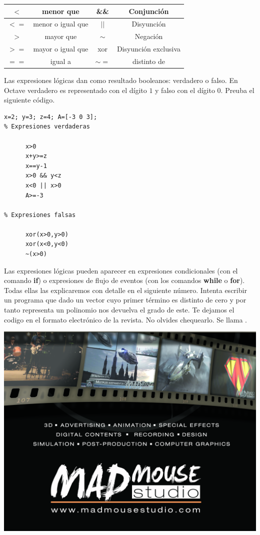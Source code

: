 \begin{center}
\begin{tabular}{|cc||cc|}
\hline
$<$ & menor que & \&\& & Conjunción\\
\hline
$<=$ & menor o igual que & $||$ & Disyunción\\
\hline
$ >$ & mayor que & $\sim$ & Negación\\
\hline
$>=$ & mayor o igual que & xor & Disyunción exclusiva\\
\hline
$==$ & igual a & $\sim =$ & distinto de\\
\hline
\end{tabular}
\end{center}

Las expresiones lógicas dan como resultado booleanos: verdadero o falso. En Octave verdadero es representado con el dígito $1$ y falso con el dígito $0$.  Preuba el siguiente código.

\begin{octavebox}
\begin{verbatim}
x=2; y=3; z=4; A=[-3 0 3];
% Expresiones verdaderas

      x>0
      x+y>=z
      x==y-1
      x>0 && y<z
      x<0 || x>0
      A>=-3
      
% Expresiones falsas 

      xor(x>0,y>0)
      xor(x<0,y<0)
      ~(x>0)

\end{verbatim}
\end{octavebox}
  
Las expresiones lógicas pueden aparecer en expresiones condicionales (con el comando \textbf{if}) o expresiones de flujo de eventos (con los comandos \textbf{while} o \textbf{for}). Todas ellas las explicaremos con detalle en el siguiente número.
Intenta escribir un programa que dado un vector cuyo primer término es distinto de cero y por tanto representa un polinomio nos devuelva el grado de este. Te dejamos el codigo en el formato electrónico de la revista. No olvides chequearlo. Se llama .

\vspace{3cm}
\noindent
\includegraphics[width=\textwidth]{pubmm.png}

\newpage





